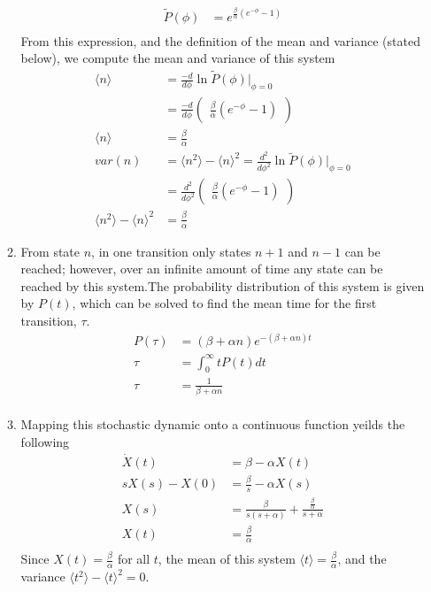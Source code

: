 \documentclass[10pt]{article}
\begin{document}
\begin{enumerate}
\begin{enumerate}
\begin{align*}
\tilde{P}(\phi) &= e^{\frac{\beta}{\alpha} (e^{-\phi} - 1)} \\
\end{align*}
From this expression, and the definition of the mean and variance (stated below), we compute the mean and variance of this system
\begin{align*}
\langle n \rangle &= \frac{-d}{d \phi} \ln \tilde{P}(\phi) \vert_{\phi = 0}\\
&= \frac{-d}{d \phi} \begin{pmatrix} \frac{\beta}{\alpha} (e^{-\phi} - 1)\end{pmatrix}\\ \langle n \rangle &= \frac{\beta}{\alpha}\\
var(n) &= \langle n^2 \rangle - \langle n\rangle^2 = \frac{d^2}{d \phi^2} \ln \tilde{P}(\phi) \vert_{\phi = 0}\\
&= \frac{d^2}{d \phi^2}  \begin{pmatrix} \frac{\beta}{\alpha} (e^{-\phi} - 1)\end{pmatrix}\\
\langle n^2 \rangle - \langle n\rangle^2 &= \frac{\beta}{\alpha}
\end{align*}
\item From state $n$, in one transition only states $n+1$ and $n-1$ can be reached; however, over an infinite amount of time any state can be reached by this system.The probability distribution of this system is given by $P(t)$, which can be solved to find the mean time for the first transition, $\tau$.
\begin{align*}
P(\tau) &= (\beta + \alpha n)e^{-(\beta+\alpha n) t} \\
\tau &= \int_0^{\infty}t P(t) dt \\
\tau &= \frac{1}{\beta + \alpha n} \\
\end{align*}
\item Mapping this stochastic dynamic onto a continuous function yeilds the following
\begin{align*}
\dot{X}(t) &= \beta - \alpha X(t) \\
sX(s) - X(0) &= \frac{\beta}{s} - \alpha X(s) \\
X(s) &= \frac{\beta}{s(s+\alpha)} + \frac{\frac{\beta}{\alpha}}{s+ \alpha} \\
X(t) &= \frac{\beta}{\alpha}\\
\end{align*}
Since $X(t) = \frac{\beta}{\alpha}$ for all $t$, the mean of this system $\langle t \rangle = \frac{\beta}{\alpha}$, and the variance $\langle t^2 \rangle - \langle t \rangle^2 = 0$.

\end{enumerate}
\end{enumerate}
\end{document}
